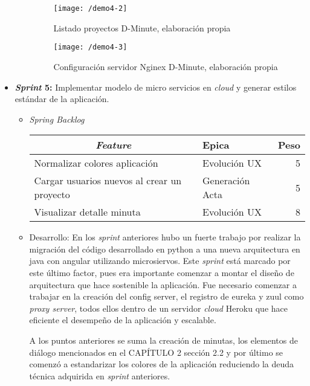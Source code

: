 \begin{itemize}
\begin{itemize}
\begin{figure}[!h]
\centering
\texttt{[image: /demo4-2]}
\label{imga-c42}
\caption{Listado proyectos D-Minute, elaboración propia}
\end{figure}

\begin{figure}[!h]
\centering
\texttt{[image: /demo4-3]}
\label{imga-c43}
\caption{Configuración servidor Nginex D-Minute, elaboración propia}
\end{figure}

\end{itemize}


	\item \textbf{\textit{Sprint} 5:} Implementar modelo de micro servicios en \textit{cloud} y generar estilos estándar de la aplicación.

\begin{itemize}
\item \textit{Spring Backlog}

\begin{table}[!h]
\centering
\label{tab:backlog5}
\begin{tabular}{|l|l|r|}
\hline
\multicolumn{1}{|c|}{\textit{\textbf{Feature}}} & \textbf{Epica} & \textbf{Peso} \\ \hline
Normalizar colores aplicación & Evolución UX & 5 \\ \hline
Cargar usuarios nuevos al crear un proyecto & Generación Acta & 5 \\ \hline
Visualizar detalle minuta & Evolución UX & 8 \\ \hline
\end{tabular}
\end{table}

\item Desarrollo: En los \textit{sprint} anteriores hubo un fuerte trabajo por realizar la migración del código desarrollado en python a una nueva arquitectura en java con angular utilizando microsiervos. Este \textit{sprint} está marcado por este último factor, pues era importante comenzar a montar el diseño de arquitectura que hace sostenible la aplicación. Fue necesario comenzar a trabajar en la creación del config server, el registro de eureka y zuul como \textit{proxy server}, todos ellos dentro de un servidor \textit{cloud} Heroku que hace eficiente el desempeño de la aplicación y escalable. 

A los puntos anteriores se suma la creación de minutas, los elementos de diálogo mencionados en el CAPÍTULO 2 sección 2.2 y por último se comenzó a estandarizar los colores de la aplicación reduciendo la deuda técnica adquirida en \textit{sprint} anteriores.


\end{itemize}
\end{itemize}

